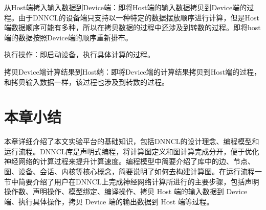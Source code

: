 从Host端拷入输入数据到Device端：即将Host端的输入数据拷贝到Device端的过程。由于DNNCL的设备端只支持以一种特定的数据摆放顺序进行计算，但是Host端数据顺序可能有多种，所以在拷贝数据的过程中还涉及到转数的过程。即将host端的数据按照Device端的顺序重新排布。

执行操作：即启动设备，执行具体计算的过程。

拷贝Device端计算结果到Host端：即将Device端的计算结果拷贝到Host端的过程，和拷贝输入数据一样，该过程也涉及到转数的过程。

\section {本章小结}
本章详细介绍了本文实验平台的基础知识，包括DNNCL的设计理念、编程模型和运行流程。DNNCL库是声明式编程，将计算图定义和图计算完成分开，便于优化神经网络的计算过程来提升计算速度。编程模型中简要介绍了库中的边、节点、图、设备、会话、内核等核心概念，简要说明了如何去构建计算图。在运行流程一节中简要介绍了用户在DNNCL上完成神经网络计算所进行的主要步骤，包括声明操作数、声明操作、模型绑定、编译操作、拷贝 Host 端的输入数据到 Device 端、执行具体操作，拷贝 Device 端的输出数据到 Host 端等过程。
